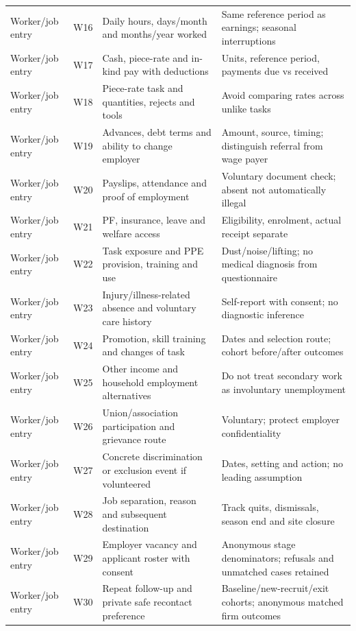 \documentclass[11pt,a4paper]{report}
\begin{document}
\begin{longtable}{>{\raggedright\arraybackslash}p{1.8cm}l>{\raggedright\arraybackslash}p{7.5cm}>{\raggedright\arraybackslash}p{4.5cm}}
Worker/\allowbreak{}job entry & W16 & Daily hours, days/\allowbreak{}month and months/\allowbreak{}year worked & Same reference period as earnings; seasonal interruptions \\
Worker/\allowbreak{}job entry & W17 & Cash, piece-rate and in-kind pay with deductions & Units, reference period, payments due vs received \\
Worker/\allowbreak{}job entry & W18 & Piece-rate task and quantities, rejects and tools & Avoid comparing rates across unlike tasks \\
Worker/\allowbreak{}job entry & W19 & Advances, debt terms and ability to change employer & Amount, source, timing; distinguish referral from wage payer \\
Worker/\allowbreak{}job entry & W20 & Payslips, attendance and proof of employment & Voluntary document check; absent not automatically illegal \\
Worker/\allowbreak{}job entry & W21 & PF, insurance, leave and welfare access & Eligibility, enrolment, actual receipt separate \\
Worker/\allowbreak{}job entry & W22 & Task exposure and PPE provision, training and use & Dust/\allowbreak{}noise/\allowbreak{}lifting; no medical diagnosis from questionnaire \\
Worker/\allowbreak{}job entry & W23 & Injury/\allowbreak{}illness-related absence and voluntary care history & Self-report with consent; no diagnostic inference \\
Worker/\allowbreak{}job entry & W24 & Promotion, skill training and changes of task & Dates and selection route; cohort before/\allowbreak{}after outcomes \\
Worker/\allowbreak{}job entry & W25 & Other income and household employment alternatives & Do not treat secondary work as involuntary unemployment \\
Worker/\allowbreak{}job entry & W26 & Union/\allowbreak{}association participation and grievance route & Voluntary; protect employer confidentiality \\
Worker/\allowbreak{}job entry & W27 & Concrete discrimination or exclusion event if volunteered & Dates, setting and action; no leading assumption \\
Worker/\allowbreak{}job entry & W28 & Job separation, reason and subsequent destination & Track quits, dismissals, season end and site closure \\
Worker/\allowbreak{}job entry & W29 & Employer vacancy and applicant roster with consent & Anonymous stage denominators; refusals and unmatched cases retained \\
Worker/\allowbreak{}job entry & W30 & Repeat follow-up and private safe recontact preference & Baseline/\allowbreak{}new-recruit/\allowbreak{}exit cohorts; anonymous matched firm outcomes \\
\end{longtable}\endgroup
\end{document}
